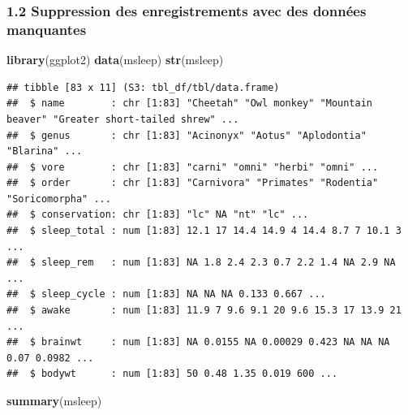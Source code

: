 \documentclass[
]{article}
\newenvironment{Shaded}{\begin{snugshade}}{\end{snugshade}}
\newcommand{\KeywordTok}[1]{\textcolor[rgb]{0.13,0.29,0.53}{\textbf{#1}}}
\newcommand{\NormalTok}[1]{#1}
\begin{document}
\hypertarget{suppression-des-enregistrements-avec-des-donnuxe9es-manquantes}{%
\subsubsection{1.2 Suppression des enregistrements avec des données
manquantes}\label{suppression-des-enregistrements-avec-des-donnuxe9es-manquantes}}

\begin{Shaded}
\begin{Highlighting}[]
\KeywordTok{library}\NormalTok{(ggplot2)}
\KeywordTok{data}\NormalTok{(msleep)}
\KeywordTok{str}\NormalTok{(msleep)}
\end{Highlighting}
\end{Shaded}

\begin{verbatim}
## tibble [83 x 11] (S3: tbl_df/tbl/data.frame)
##  $ name        : chr [1:83] "Cheetah" "Owl monkey" "Mountain beaver" "Greater short-tailed shrew" ...
##  $ genus       : chr [1:83] "Acinonyx" "Aotus" "Aplodontia" "Blarina" ...
##  $ vore        : chr [1:83] "carni" "omni" "herbi" "omni" ...
##  $ order       : chr [1:83] "Carnivora" "Primates" "Rodentia" "Soricomorpha" ...
##  $ conservation: chr [1:83] "lc" NA "nt" "lc" ...
##  $ sleep_total : num [1:83] 12.1 17 14.4 14.9 4 14.4 8.7 7 10.1 3 ...
##  $ sleep_rem   : num [1:83] NA 1.8 2.4 2.3 0.7 2.2 1.4 NA 2.9 NA ...
##  $ sleep_cycle : num [1:83] NA NA NA 0.133 0.667 ...
##  $ awake       : num [1:83] 11.9 7 9.6 9.1 20 9.6 15.3 17 13.9 21 ...
##  $ brainwt     : num [1:83] NA 0.0155 NA 0.00029 0.423 NA NA NA 0.07 0.0982 ...
##  $ bodywt      : num [1:83] 50 0.48 1.35 0.019 600 ...
\end{verbatim}

\begin{Shaded}
\begin{Highlighting}[]
\KeywordTok{summary}\NormalTok{(msleep)}
\end{Highlighting}
\end{Shaded}
\end{document}
